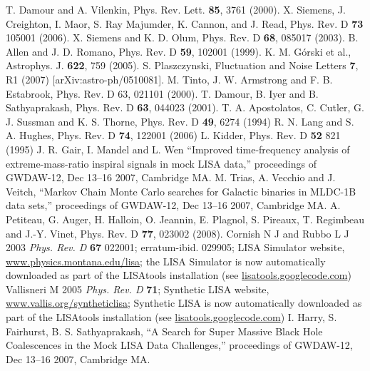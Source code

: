\documentclass{iopart}
\begin{document}
\begin{thebibliography}{99}
%
 T. Damour and A. Vilenkin, Phys. Rev. Lett. {\bf 85}, 3761 (2000).
%
 X. Siemens, J. Creighton, I. Maor, S. Ray Majumder,
K. Cannon, and J. Read, Phys. Rev. D {\bf 73} 105001 (2006).
%
 X. Siemens and K. D. Olum, Phys. Rev. D {\bf 68}, 085017 (2003).
%
 B. Allen and J. D. Romano, Phys. Rev. D {\bf 59}, 102001 (1999).
%
 K. M. G\'orski et al., Astrophys. J. {\bf 622}, 759 (2005).
%
 S. Plaszczynski, Fluctuation and Noise Letters {\bf 7}, R1 (2007) [arXiv:astro-ph/0510081].
%
 M. Tinto, J. W. Armstrong and F. B. Estabrook, Phys. Rev. D 63, 021101 (2000).
%
 T. Damour, B. Iyer and B. Sathyaprakash, Phys. Rev. D {\bf 63}, 044023 (2001).
%
 T. A. Apostolatos, C. Cutler, G. J. Sussman and K. S. Thorne, Phys. Rev. D {\bf 49},
6274 (1994)
%
 R. N. Lang and S. A. Hughes, Phys. Rev. D {\bf 74}, 122001 (2006) 
%
 L. Kidder, Phys. Rev. D {\bf 52}  821 (1995)
%
 J. R. Gair, I. Mandel and L. Wen
``Improved time-frequency analysis of extreme-mass-ratio inspiral signals in mock LISA data,'' proceedings of GWDAW-12, Dec 13--16 2007, Cambridge MA.
%
 M. Trias, A. Vecchio and J. Veitch,
``Markov Chain Monte Carlo searches for Galactic binaries in MLDC-1B data sets,'' proceedings of GWDAW-12, Dec 13--16 2007, Cambridge MA.
%
 A. Petiteau, G. Auger, H. Halloin, O. Jeannin, E. Plagnol, S. Pireaux, T. Regimbeau and J.-Y. Vinet, Phys. Rev. D {\bf 77}, 023002 (2008).
%
 Cornish N J and Rubbo L J 2003 \emph{Phys. Rev. D} \textbf{67} 022001; erratum-ibid. 029905; LISA Simulator website, \url{www.physics.montana.edu/lisa}; the LISA Simulator is now automatically downloaded as part of the LISAtools installation (see \url{lisatools.googlecode.com})
%
 Vallisneri M 2005 \emph{Phys. Rev. D} \textbf{71}; Synthetic LISA website, \url{www.vallis.org/syntheticlisa}; Synthetic LISA is now automatically downloaded as part of the LISAtools installation (see \url{lisatools.googlecode.com})
%
 I. Harry, S. Fairhurst, B. S. Sathyaprakash, ``A Search for Super Massive Black Hole Coalescences in the Mock LISA Data Challenges,'' proceedings of GWDAW-12, Dec 13--16 2007, Cambridge MA.
%
\end{thebibliography}
\end{document}
